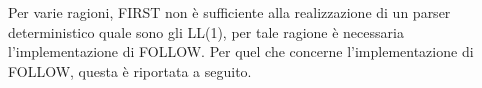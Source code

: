 \documentclass{subfiles}
\begin{document}
Per varie ragioni, FIRST non è sufficiente alla realizzazione di un parser deterministico quale sono gli LL(1),
per tale ragione è necessaria l'implementazione di FOLLOW.
Per quel che concerne l'implementazione di FOLLOW, questa è riportata a seguito.

\end{document}
